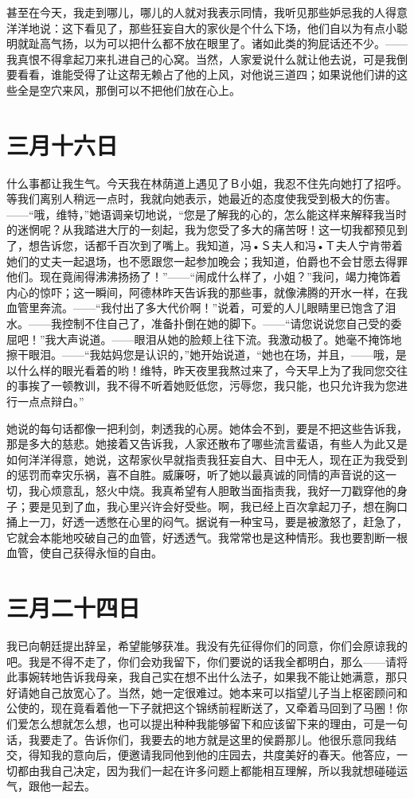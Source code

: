 \documentclass[12pt,oneside]{book}
\begin{document}
甚至在今天，我走到哪儿，哪儿的人就对我表示同情，我听见那些妒忌我的人得意洋洋地说：这下看见了，那些狂妄自大的家伙是个什么下场，他们自以为有点小聪明就趾高气扬，以为可以把什么都不放在眼里了。诸如此类的狗屁话还不少。——我真恨不得拿起刀来扎进自己的心窝。当然，人家爱说什么就让他去说，可是我倒要看看，谁能受得了让这帮无赖占了他的上风，对他说三道四；如果说他们讲的这些全是空穴来风，那倒可以不把他们放在心上。
　　

\chapter{三月十六日}
什么事都让我生气。今天我在林荫道上遇见了Ｂ小姐，我忍不住先向她打了招呼。等我们离别人稍远一点时，我就向她表示，她最近的态度使我受到极大的伤害。——“哦，维特，”她语调亲切地说，“您是了解我的心的，怎么能这样来解释我当时的迷惘呢？从我踏进大厅的一刻起，我为您受了多大的痛苦呀！这一切我都预见到了，想告诉您，话都千百次到了嘴上。我知道，冯•Ｓ夫人和冯•Ｔ夫人宁肯带着她们的丈夫一起退场，也不愿跟您一起参加晚会；我知道，伯爵也不会甘愿去得罪他们。现在竟闹得沸沸扬扬了！”——“闹成什么样了，小姐？”我问，竭力掩饰着内心的惊吓；这一瞬间，阿德林昨天告诉我的那些事，就像沸腾的开水一样，在我血管里奔流。——“我付出了多大代价啊！”说着，可爱的人儿眼睛里已饱含了泪水。——我控制不住自己了，准备扑倒在她的脚下。——“请您说说您自己受的委屈吧！”我大声说道。——眼泪从她的脸颊上往下流。我激动极了。她毫不掩饰地擦干眼泪。——“我姑妈您是认识的，”她开始说道，“她也在场，并且，——哦，是以什么样的眼光看着的哟！维特，昨天夜里我熬过来了，今天早上为了我同您交往的事挨了一顿教训，我不得不听着她贬低您，污辱您，我只能，也只允许我为您进行一点点辩白。”

她说的每句话都像一把利剑，刺透我的心房。她体会不到，要是不把这些告诉我，那是多大的慈悲。她接着又告诉我，人家还散布了哪些流言蜚语，有些人为此又是如何洋洋得意，她说，这帮家伙早就指责我狂妄自大、目中无人，现在正为我受到的惩罚而幸灾乐祸，喜不自胜。威廉呀，听了她以最真诚的同情的声音说的这一切，我心烦意乱，怒火中烧。我真希望有人胆敢当面指责我，我好一刀戳穿他的身子；要是见到了血，我心里兴许会好受些。啊，我已经上百次拿起刀子，想在胸口捅上一刀，好透一透憋在心里的闷气。据说有一种宝马，要是被激怒了，赶急了，它就会本能地咬破自己的血管，好透透气。我常常也是这种情形。我也要割断一根血管，使自己获得永恒的自由。
　　

\chapter{三月二十四日}
我已向朝廷提出辞呈，希望能够获准。我没有先征得你们的同意，你们会原谅我的吧。我是不得不走了，你们会劝我留下，你们要说的话我全都明白，那么——请将此事婉转地告诉我母亲，我自己实在想不出什么法子，如果我不能让她满意，那只好请她自己放宽心了。当然，她一定很难过。她本来可以指望儿子当上枢密顾问和公使的，现在竟看着他一下子就把这个锦绣前程断送了，又牵着马回到了马圈！你们爱怎么想就怎么想，也可以提出种种我能够留下和应该留下来的理由，可是一句话，我要走了。告诉你们，我要去的地方就是这里的侯爵那儿。他很乐意同我结交，得知我的意向后，便邀请我同他到他的庄园去，共度美好的春天。他答应，一切都由我自己决定，因为我们一起在许多问题上都能相互理解，所以我就想碰碰运气，跟他一起去。
\end{document}
